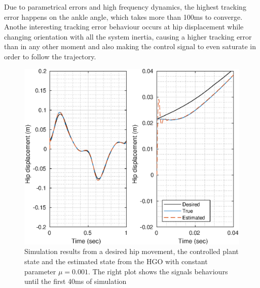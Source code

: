 \documentclass[letterpaper, 10 pt, journal, twocolumn]{IEEEtran}  %
\theoremstyle{plain}
\theoremstyle{definition}
\theoremstyle{remark}
\begin{document}
Due to parametrical errors and high frequency dynamics, the highest tracking error happens on the ankle angle, which takes more than 100ms to converge. Anothe interesting tracking error behaviour occurs at hip displacement while changing orientation with all the system inertia, causing a higher tracking error than in any other moment and also making the control signal to even saturate in order to follow the trajectory.  

%
%
%
%
%
%
%
%
%
\begin{figure}[h!]
	\begin{center}
	\includegraphics[width = \columnwidth]{Figs/q_hip_mu_1e-03.eps}
	\caption{ Simulation results from a desired hip movement, the controlled plant state and the estimated state from the HGO with constant parameter $\mu=0.001$. The right plot shows the signals behaviours until the first 40ms of simulation}
	\label{fig:hip}
	\end{center}
\end{figure}
%
%
\end{document}
